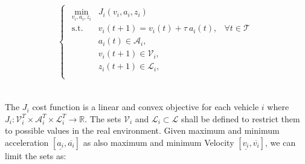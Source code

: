 \begin{align}
\left\{ \begin{matrix}
\begin{aligned}
 \min_{v_i, a_i, z_i} & J_i(v_i, a_i, z_i) & \\
\text{s.t.} \quad & v_i(t+1)=v_i(t)+ \tau \ a_i(t), & \forall t \in \mathcal{T} \\
& a_i(t) \in \mathcal{A}_i,  &   \\
 & v_i(t+1) \in \mathcal{V}_i,  &   \\
 & z_i(t+1) \in \mathcal{L}_i,  &   \\
\end{aligned}
\end{matrix} \right.
\label{eq:MPC1}
\end{align}




\\
The $J_i$ cost function is a linear and convex objective for each vehicle $i$ where $J_i:\mathcal{V}^T_i \times \mathcal{A}^T_i \times  \mathcal{L}^T_i \longrightarrow  \mathbb{R}$. The sets $\mathcal{V}_i$ and $\mathcal{L}_i \subset \mathcal{L}$ shall be defined to restrict them to possible values in the real environment. Given maximum and minimum acceleration $\left[ \underline{a_i}, \overline{a_i} \right]$ as also maximum and minimum Velocity $\left[ \underline{v_i}, \overline{v_i} \right]$, we can limit the sets as:

